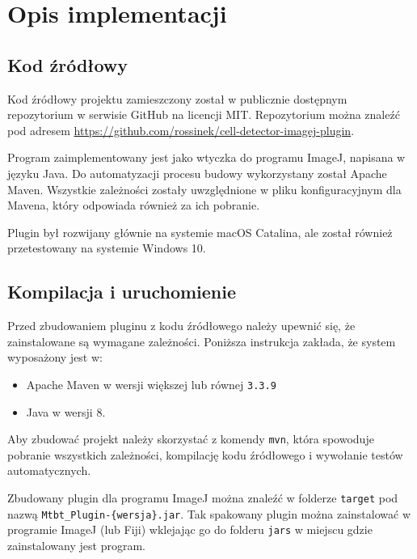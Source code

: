 \documentclass[declaration,shortabstract,mgr]{iithesis}
\begin{document}

\chapter{Opis implementacji}



\section{Kod źródłowy}

Kod źródłowy projektu zamieszczony został w publicznie dostępnym repozytorium w serwisie GitHub na licencji MIT.
Repozytorium można znaleźć pod adresem
\linebreak\url{https://github.com/rossinek/cell-detector-imagej-plugin}.

Program zaimplementowany jest jako wtyczka do programu ImageJ, napisana w języku Java. Do automatyzacji procesu budowy wykorzystany został Apache Maven. Wszystkie zależności zostały uwzględnione w pliku konfiguracyjnym dla Mavena, który odpowiada również za ich pobranie.

Plugin był rozwijany głównie na systemie macOS Catalina, ale został również przetestowany na systemie Windows 10.

\section{Kompilacja i uruchomienie}

Przed zbudowaniem pluginu z kodu źródłowego należy upewnić się, że zainstalowane są wymagane zależności. Poniższa instrukcja zakłada, że system wyposażony jest w:

\begin{itemize}
  \item Apache Maven w wersji większej lub równej \texttt{3.3.9}
  \item Java w wersji 8.
\end{itemize}

Aby zbudować projekt należy skorzystać z komendy \texttt{mvn}, która spowoduje pobranie wszystkich zależności,  kompilację kodu źródłowego i wywołanie testów automatycznych.

Zbudowany plugin dla programu ImageJ można znaleźć w folderze \texttt{target} pod nazwą \texttt{Mtbt\_Plugin-\{wersja\}.jar}. Tak spakowany plugin można zainstalować w programie ImageJ (lub Fiji) wklejając go do folderu \texttt{jars} w miejscu gdzie zainstalowany jest program.
\end{document}

